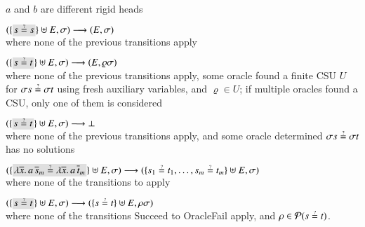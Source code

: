 \begin{description}[labelwidth=\widthof{\rm\textsf{Normalize$_{\alpha\eta}$}}]
      $a$ and $b$ are different rigid heads
  \item[\rm\unifrulename{Delete}]  $(\{\selected{s \unif s}\}\uplus E, \sigma) \newunifarrow (E, \sigma)$\\
      where none of the previous transitions apply
  \item[\rm\unifrulename{OracleSucc}]
  $(\{\selected{s \unif t}\}\uplus E, \sigma) \newunifarrow (E, \varrho \sigma)$\\
      where none of the previous transitions apply, 
      some oracle found a finite CSU $U$ for $\sigma s \unif \sigma t $ using fresh auxiliary variables,
      and $\varrho \in U$; if multiple oracles found a CSU, only one of them is considered
  \item[\rm\unifrulename{OracleFail}]
  $(\{\selected{s \unif t}\}\uplus E, \sigma) \newunifarrow \bot$\\
  where none of the previous transitions apply, 
  and some oracle determined $\sigma s \unif \sigma t$ has no solutions
  \item[\rm\unifrulename{Decompose}]
      $(\{\selected{\lambda \overline{x}. \, a \, \overline{s}_m \unif \lambda \overline{x}. \, a \, \overline{t}_m}\}
      \uplus E, \sigma) 
      \newunifarrow 
      ( \{s_1 \unif t_1, \ldots ,s_m \unif t_m\} \uplus E,
      \sigma)$\\
      where none of the transitions  to  apply
  \item[\rm\textsf{Bind}]
      $(\{\selected{s \unif t}\} 
      \uplus E, \sigma) 
      \newunifarrow 
      (\{s \unif t\}
      \uplus E, \rho \sigma)$\\
      where none of the transitions \textsf{Succeed} to \textsf{OracleFail} apply,
      and $\rho\in\mathcal{P}(s \unif t)$.
\end{description}


